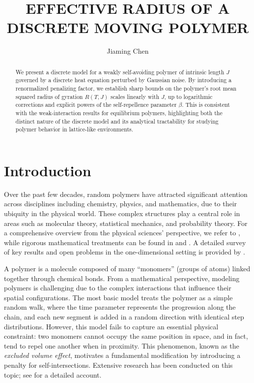 \documentclass[12pt]{amsart}
\numberwithin{equation}{section}
\newcommand{\1}{\mathbf{1}}
\begin{document}
\title[DISCRETE MOVING POLYMER]{EFFECTIVE RADIUS OF A DISCRETE MOVING POLYMER}
\author{Jiaming Chen}
\address{Dept. of Mathematics
\\Imperial College
\\London, UK}
\begin{abstract}
We present a discrete model for a weakly self-avoiding polymer of intrinsic length $J$ governed by a discrete heat equation perturbed by Gaussian noise. By introducing a renormalized penalizing factor, we establish sharp bounds on the polymer's root mean squared radius of gyration $R(T,J)$ scales linearly with $J$, up to logarithmic corrections and explicit powers of the self-repellence parameter $\beta$. This is consistent with the weak-interaction results for equilibrium polymers, highlighting both the distinct nature of the discrete model and its analytical tractability for studying polymer
behavior in lattice-like environments.
\end{abstract}

\maketitle

\section{Introduction}
Over the past few decades, random polymers have attracted significant attention across disciplines including chemistry, physics, and mathematics, due to their ubiquity in the physical world. These complex structures play a central role in areas such as molecular theory, statistical mechanics, and probability theory. For a comprehensive overview from the physical sciences' perspective, we refer to \cite{doi1988theory}, while rigorous mathematical treatments can be found in \cite{hollander2009random} and \cite{bauerschmidt2012lectures}. A detailed survey of key results and open problems in the one-dimensional setting is provided by \cite{van2001survey}.

A polymer is a molecule composed of many ``monomers'' (groups of atoms) linked together through chemical bonds. From a mathematical perspective, modeling polymers is challenging due to the complex interactions that influence their spatial configurations. The most basic model treats the polymer as a simple random walk, where the time parameter represents the progression along the chain, and each new segment is added in a random direction with identical step distributions. However, this model fails to capture an essential physical constraint: two monomers cannot occupy the same position in space, and in fact, tend to repel one another when in proximity. This phenomenon, known as the \textit{excluded volume effect}, motivates a fundamental modification by introducing a penalty for self-intersections. Extensive research has been conducted on this topic; see \cite{madras2013self} for a detailed account. 
\end{document}
